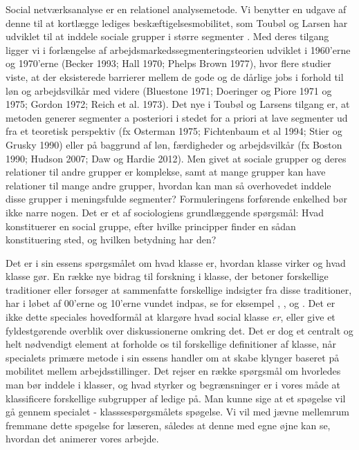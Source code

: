 Social netværksanalyse er en relationel analysemetode. Vi benytter en udgave af denne til at kortlægge lediges beskæftigelsesmobilitet, som Toubøl og Larsen har udviklet til at inddele sociale grupper i større segmenter \parencite{TouboelLarsenJensen2013, TouboelLarsen2015}. Med deres tilgang ligger vi i forlængelse af arbejdsmarkedssegmenteringsteorien udviklet i 1960'erne og 1970'erne (Becker 1993; Hall 1970; Phelps Brown 1977), hvor flere studier viste, at der eksisterede barrierer mellem de gode og de dårlige jobs i forhold til løn og arbejdsvilkår med videre (Bluestone 1971; Doeringer og Piore 1971 og 1975; Gordon 1972; Reich et al. 1973). Det nye i Toubøl og Larsens tilgang er, at metoden generer segmenter a posteriori i stedet for a priori at lave segmenter ud fra et teoretisk perspektiv (fx Osterman 1975; Fichtenbaum et al 1994; Stier og Grusky 1990) eller på baggrund af løn, færdigheder og arbejdsvilkår (fx Boston 1990; Hudson 2007; Daw og Hardie 2012). Men givet at sociale grupper og deres relationer til andre grupper er komplekse, samt at mange grupper kan have relationer til mange andre grupper, hvordan kan man så overhovedet inddele disse grupper i meningsfulde segmenter? Formuleringens forførende enkelhed bør ikke narre nogen. Det er et af sociologiens grundlæggende spørgsmål: Hvad konstituerer en social gruppe, efter hvilke principper finder en sådan konstituering sted, og hvilken betydning har den?

Det er i sin essens spørgsmålet om hvad klasse er, hvordan klasse virker og hvad klasse gør. En række nye bidrag til forskning i klasse, der betoner forskellige traditioner eller forsøger at sammenfatte forskellige indsigter fra disse traditioner, har i løbet af 00'erne og 10'erne vundet indpas, se for eksempel \textcite{Lareau2008}, \textcite{Resnick2006}, \textcite{Savage2013} og \textcite{Andrade2014}. Det er ikke dette speciales hovedformål at klargøre hvad social klasse \emph{er}, eller give et fyldestgørende overblik over diskussionerne omkring det. Det er dog et centralt og helt nødvendigt element at forholde os til forskellige definitioner af klasse, når specialets primære metode i sin essens handler om at skabe klynger baseret på mobilitet mellem arbejdsstillinger. Det rejser en række spørgsmål om hvorledes man bør inddele i klasser, og hvad styrker og begrænsninger er i vores måde at klassificere forskellige subgrupper af ledige på. Man kunne sige at et spøgelse vil gå gennem specialet - klasssespørgsmålets spøgelse. Vi vil med jævne mellemrum fremmane dette spøgelse for læseren, således at denne med egne øjne kan se, hvordan det animerer vores arbejde.

